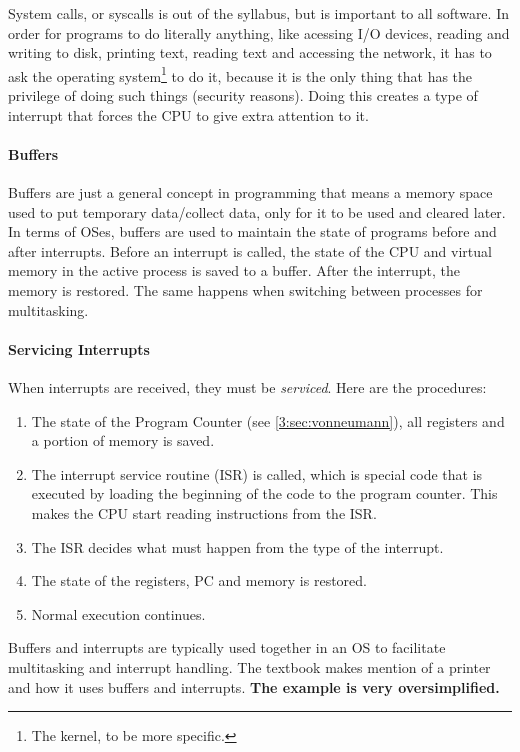 \documentclass[../main.tex]{subfiles}
\begin{document}
System calls, or syscalls is out of the syllabus, but is important to all software. In order for programs to do literally anything, like acessing I/O devices, reading and writing to disk, printing text, reading text and accessing the network, it has to ask the operating system\footnote{The kernel, to be more specific.} to do it, because it is the only thing that has the privilege of doing such things (security reasons). Doing this creates a type of interrupt that forces the CPU to give extra attention to it.

\paragraph{Buffers}

Buffers are just a general concept in programming that means a memory space used to put temporary data/collect data, only for it to be used and cleared later. In terms of OSes, buffers are used to maintain the state of programs before and after interrupts. Before an interrupt is called, the state of the CPU and virtual memory in the active process is saved to a buffer. After the interrupt, the memory is restored. The same happens when switching between processes for multitasking.

\paragraph{Servicing Interrupts}

When interrupts are received, they must be \emph{serviced}. Here are the procedures:

\begin{enumerate}
    \item The state of the Program Counter (see \ref{3:sec:vonneumann}), all registers and a portion of memory is saved.
    \item The interrupt service routine (ISR) is called, which is special code that is executed by loading the beginning of the code to the program counter. This makes the CPU start reading instructions from the ISR.
    \item The ISR decides what must happen from the type of the interrupt.
    \item The state of the registers, PC and memory is restored.
    \item Normal execution continues.
\end{enumerate}

Buffers and interrupts are typically used together in an OS to facilitate multitasking and interrupt handling. The textbook makes mention of a printer and how it uses buffers and interrupts. \textbf{The example is very oversimplified.}
\end{document}
